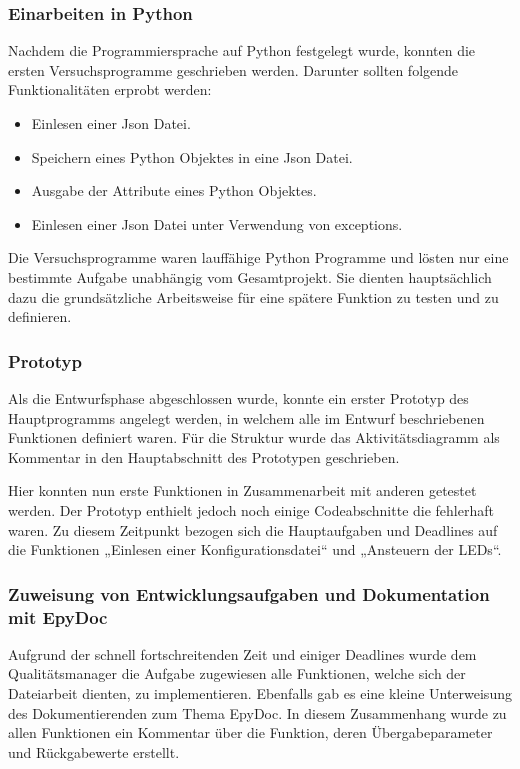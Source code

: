 \subsubsection{Einarbeiten in Python}
Nachdem die Programmiersprache auf Python festgelegt wurde, konnten die ersten Versuchsprogramme geschrieben werden. Darunter sollten folgende Funktionalitäten erprobt werden:
\begin{itemize}
	\item Einlesen einer Json Datei.
	\item Speichern eines Python Objektes in eine Json Datei.
	\item Ausgabe der Attribute eines Python Objektes.
	\item Einlesen einer Json Datei unter Verwendung von exceptions.
\end{itemize}
Die Versuchsprogramme waren lauffähige Python Programme und lösten nur eine bestimmte Aufgabe unabhängig vom Gesamtprojekt. Sie dienten hauptsächlich dazu die grundsätzliche Arbeitsweise für eine spätere Funktion zu testen und zu definieren.

\subsubsection{Prototyp}
Als die Entwurfsphase abgeschlossen wurde, konnte ein erster Prototyp des Hauptprogramms angelegt werden, in welchem alle im Entwurf beschriebenen Funktionen definiert waren. Für die Struktur wurde das Aktivitätsdiagramm als Kommentar in den Hauptabschnitt des Prototypen geschrieben.

Hier konnten nun erste Funktionen in Zusammenarbeit mit anderen getestet werden. Der Prototyp enthielt jedoch noch einige Codeabschnitte die fehlerhaft waren. Zu diesem Zeitpunkt bezogen sich die Hauptaufgaben und Deadlines auf die Funktionen „Einlesen einer Konfigurationsdatei“ und „Ansteuern der LEDs“.

\subsubsection{Zuweisung von Entwicklungsaufgaben und Dokumentation mit EpyDoc}
Aufgrund der schnell fortschreitenden Zeit und einiger Deadlines wurde dem Qualitätsmanager die Aufgabe zugewiesen alle Funktionen, welche sich der Dateiarbeit dienten, zu implementieren.
Ebenfalls gab es eine kleine Unterweisung des Dokumentierenden zum Thema EpyDoc. In diesem Zusammenhang wurde zu allen Funktionen ein Kommentar über die Funktion, deren Übergabeparameter und Rückgabewerte erstellt.

